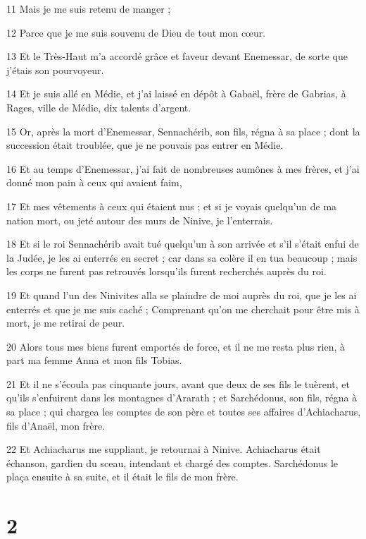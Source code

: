 \par 11 Mais je me suis retenu de manger ;
\par 12 Parce que je me suis souvenu de Dieu de tout mon cœur.
\par 13 Et le Très-Haut m'a accordé grâce et faveur devant Enemessar, de sorte que j'étais son pourvoyeur.
\par 14 Et je suis allé en Médie, et j'ai laissé en dépôt à Gabaël, frère de Gabrias, à Rages, ville de Médie, dix talents d'argent.
\par 15 Or, après la mort d'Enemessar, Sennachérib, son fils, régna à sa place ; dont la succession était troublée, que je ne pouvais pas entrer en Médie.
\par 16 Et au temps d'Enemessar, j'ai fait de nombreuses aumônes à mes frères, et j'ai donné mon pain à ceux qui avaient faim,
\par 17 Et mes vêtements à ceux qui étaient nus ; et si je voyais quelqu'un de ma nation mort, ou jeté autour des murs de Ninive, je l'enterrais.
\par 18 Et si le roi Sennachérib avait tué quelqu'un à son arrivée et s'il s'était enfui de la Judée, je les ai enterrés en secret ; car dans sa colère il en tua beaucoup ; mais les corps ne furent pas retrouvés lorsqu'ils furent recherchés auprès du roi.
\par 19 Et quand l'un des Ninivites alla se plaindre de moi auprès du roi, que je les ai enterrés et que je me suis caché ; Comprenant qu'on me cherchait pour être mis à mort, je me retirai de peur.
\par 20 Alors tous mes biens furent emportés de force, et il ne me resta plus rien, à part ma femme Anna et mon fils Tobias.
\par 21 Et il ne s'écoula pas cinquante jours, avant que deux de ses fils le tuèrent, et qu'ils s'enfuirent dans les montagnes d'Ararath ; et Sarchédonus, son fils, régna à sa place ; qui chargea les comptes de son père et toutes ses affaires d'Achiacharus, fils d'Anaël, mon frère.
\par 22 Et Achiacharus me suppliant, je retournai à Ninive. Achiacharus était échanson, gardien du sceau, intendant et chargé des comptes. Sarchédonus le plaça ensuite à sa suite, et il était le fils de mon frère.

\chapter{2}

